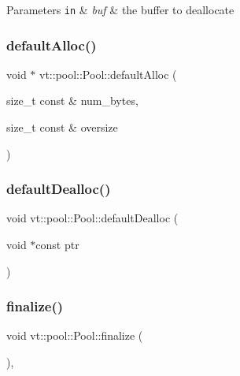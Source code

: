 \begin{DoxyParams}[1]{Parameters}
\mbox{\tt in}  & {\em buf} & the buffer to deallocate \\
\hline
\end{DoxyParams}
\mbox{\label{structvt_1_1pool_1_1_pool_ad9eb4c0efa76dc46487e23e265554943}} 
\subsubsection{\texorpdfstring{default\+Alloc()}{defaultAlloc()}}
{\footnotesize\ttfamily void $\ast$ vt\+::pool\+::\+Pool\+::default\+Alloc (\begin{DoxyParamCaption}\item[{size\+\_\+t const \&}]{num\+\_\+bytes,  }\item[{size\+\_\+t const \&}]{oversize }\end{DoxyParamCaption})\hspace{0.3cm}{\ttfamily [private]}}

\mbox{\label{structvt_1_1pool_1_1_pool_a8d8654019bf80cd274bea1797645db37}} 
\subsubsection{\texorpdfstring{default\+Dealloc()}{defaultDealloc()}}
{\footnotesize\ttfamily void vt\+::pool\+::\+Pool\+::default\+Dealloc (\begin{DoxyParamCaption}\item[{void $\ast$const}]{ptr }\end{DoxyParamCaption})\hspace{0.3cm}{\ttfamily [private]}}

\mbox{\label{structvt_1_1pool_1_1_pool_a45a2880809625a77bb93c3dfcd9c7603}} 
\subsubsection{\texorpdfstring{finalize()}{finalize()}}
{\footnotesize\ttfamily void vt\+::pool\+::\+Pool\+::finalize (\begin{DoxyParamCaption}{ }\end{DoxyParamCaption})\hspace{0.3cm}{\ttfamily [override]}, {\ttfamily [virtual]}}



